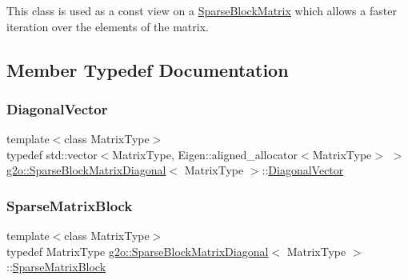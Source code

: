 This class is used as a const view on a \mbox{\hyperlink{classg2o_1_1_sparse_block_matrix}{Sparse\+Block\+Matrix}} which allows a faster iteration over the elements of the matrix. 

\subsection{Member Typedef Documentation}
\mbox{\label{classg2o_1_1_sparse_block_matrix_diagonal_a2eb7fc4130fac5c499b57f3bec855812}} 
\subsubsection{\texorpdfstring{Diagonal\+Vector}{DiagonalVector}}
{\footnotesize\ttfamily template$<$class Matrix\+Type$>$ \\
typedef std\+::vector$<$Matrix\+Type, Eigen\+::aligned\+\_\+allocator$<$Matrix\+Type$>$ $>$ \mbox{\hyperlink{classg2o_1_1_sparse_block_matrix_diagonal}{g2o\+::\+Sparse\+Block\+Matrix\+Diagonal}}$<$ Matrix\+Type $>$\+::\mbox{\hyperlink{classg2o_1_1_sparse_block_matrix_diagonal_a2eb7fc4130fac5c499b57f3bec855812}{Diagonal\+Vector}}}

\mbox{\label{classg2o_1_1_sparse_block_matrix_diagonal_a93a57bc93d5b099fcd424ba1fc1a0585}} 
\subsubsection{\texorpdfstring{Sparse\+Matrix\+Block}{SparseMatrixBlock}}
{\footnotesize\ttfamily template$<$class Matrix\+Type$>$ \\
typedef Matrix\+Type \mbox{\hyperlink{classg2o_1_1_sparse_block_matrix_diagonal}{g2o\+::\+Sparse\+Block\+Matrix\+Diagonal}}$<$ Matrix\+Type $>$\+::\mbox{\hyperlink{classg2o_1_1_sparse_block_matrix_diagonal_a93a57bc93d5b099fcd424ba1fc1a0585}{Sparse\+Matrix\+Block}}}



